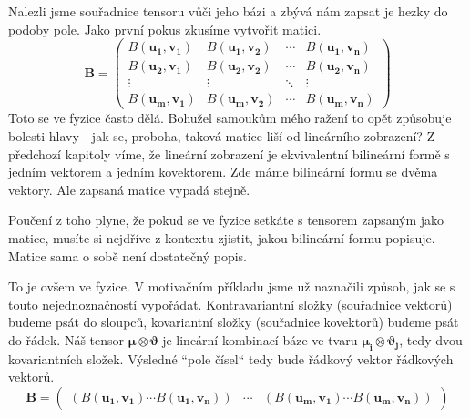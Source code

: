 \documentclass[a5paper,12pt]{amsbook}
\theoremstyle{definition}
\newcommand{\myvec}[1]{\bm{#1}}
\newcommand{\mymatrix}[1]{\mathbf{#1}}
\begin{document}
Nalezli jsme souřadnice tensoru vůči jeho bázi a zbývá nám zapsat je hezky do podoby pole. Jako první
pokus zkusíme vytvořit matici.
\begin{equation*}
\mymatrix{B} = 
\left(\begin{array}{cccc}
  B(\myvec{u_1}, \myvec{v_1}) & B(\myvec{u_1}, \myvec{v_2}) & \cdots & B(\myvec{u_1}, \myvec{v_n}) \\
  B(\myvec{u_2}, \myvec{v_1}) & B(\myvec{u_2}, \myvec{v_2}) & \cdots & B(\myvec{u_2}, \myvec{v_n}) \\
  \vdots & \vdots & \ddots & \vdots \\
  B(\myvec{u_m}, \myvec{v_1}) & B(\myvec{u_m}, \myvec{v_2}) & \cdots & B(\myvec{u_m}, \myvec{v_n})
\end{array}\right)
\end{equation*}
Toto se ve fyzice často dělá. Bohužel samoukům mého ražení to opět způsobuje bolesti hlavy - jak se,
proboha, taková matice liší od lineárního zobrazení? Z předchozí kapitoly víme, že lineární
zobrazení je ekvivalentní bilineární formě s jedním vektorem a jedním kovektorem. Zde máme
bilineární formu se dvěma vektory. Ale zapsaná matice vypadá stejně.

Poučení z toho plyne, že pokud se ve fyzice setkáte s tensorem zapsaným jako matice, musíte si
nejdříve z kontextu zjistit, jakou bilineární formu popisuje. Matice sama o sobě není dostatečný
popis.

To je ovšem ve fyzice. V motivačním příkladu jsme už naznačili způsob, jak se s touto nejednoznačností
vypořádat. Kontravariantní složky (souřadnice vektorů) budeme psát do sloupců, kovariantní složky
(souřadnice kovektorů) budeme psát do řádek. Náš tensor
$\myvec{\mu}\otimes\myvec{\vartheta}$ je lineární kombinací báze ve tvaru
$\myvec{\mu_i}\otimes\myvec{\vartheta_j}$, tedy dvou kovariantních složek. Výsledné ``pole čísel``
tedy bude řádkový vektor řádkových vektorů.
\begin{equation*}
\mymatrix{B} = 
\left(\begin{array}{ccc}
  \left(
    B(\myvec{u_1}, \myvec{v_1}) \cdots B(\myvec{u_1}, \myvec{v_n})
  \right) &
  \cdots &
  \left(
    B(\myvec{u_m}, \myvec{v_1}) \cdots B(\myvec{u_m}, \myvec{v_n})
  \right)
\end{array}\right)
\end{equation*}
\end{document}
